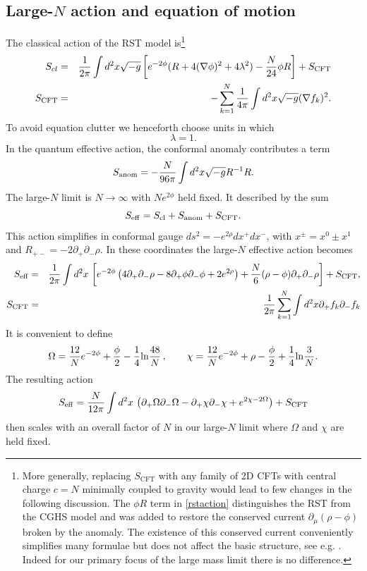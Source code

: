 \documentclass[12pt,oneside,letterpaper]{article}
\newcommand{\p}{\partial}
\newcommand{\f}{\frac}
\newcommand{\be}{\begin{equation}}
\newcommand{\ee}{\end{equation}}
\def\be{\begin{eqnarray}}
\def\ee{\end{eqnarray}}
\newcommand{\bea}{\begin{eqnarray}}
\newcommand{\eea}{\end{eqnarray}}
\let\l=\lambda \let\m=\mu \let\n=\nu \let\x=\xi \let\p=\phi \let\r=v
\let\f=\frac
\def\be{\begin{equation}}
\def\ee{\end{equation}}
\def\del{\partial}
\def\m{{M}}
\def\log{{\rm ln}}
\renewcommand{\p}{\partial}
\numberwithin{equation}{section}
\def \be {\begin{equation}}
\def \ee {\end{equation}}
\begin{document}
\subsection{Large-$N$ action and equation of motion}
The classical action of the RST model  is\footnote{More generally, replacing $S_{\text{CFT}}$ with any family of 2D CFTs with central charge $c=N$ minimally coupled to gravity would lead to few changes in the following discussion. The $\phi R$ term in \eqref{rstaction} distinguishes the RST from the CGHS model \cite{Callan:1992rs} and was added to restore the conserved current $\partial_\mu (\rho-\phi)$ broken by the anomaly. The existence of this conserved current conveniently simplifies many formulae but does not affect the basic structure, see e.g. \cite{Piran:1993tq}. Indeed for our primary focus of the large mass limit there is no difference. }
\bea\label{rstaction}
S_{cl} &=& \f{1}{2\pi}\int d^2 x \sqrt{-g} \left[e^{-2\phi}(R+4(\nabla \phi)^2+4\l^2) 
-\f{N}{24}  \phi R\right]+S_{\text{CFT}}\cr S_{\text{CFT}}&=& -\sum_{k=1}^N\f{1}{4\pi}\int d^2 x \sqrt{-g}(\nabla f_k)^2   .
\eea
To avoid equation clutter we henceforth choose units  in which 
\be \l=1.\ee
In the quantum effective action, the conformal anomaly contributes a term  \be S_{\rm anom} = -\frac{N}{96\pi} \int d^2 x \sqrt{-g}R \Box^{-1}R.\ee   The large-$N$ limit is  $N\to \infty$ with $Ne^{2\phi}$ held fixed. It described  by the sum \be S_{\rm eff}=S_{\rm cl}+S_{\rm anom}+S_{\text{CFT}}.\ee
This action simplifies in conformal gauge $ds^2 = -e^{2\rho}dx^+ dx^-$, with $x^{\pm} = x^0\pm x^1$ and $R_{+-}=-2\del_+\del_-\rho$. In these coordinates the large-$N$ effective action  becomes
\bea\label{rsteff}
S_{\rm eff}&=&\f{1}{2\pi}\int d^2 x\, \left[e^{-2\phi}\left(4\p_+\p_- \rho-8 \p_+\phi \p_-\phi+2e^{2\rho}\right) +\f{N}{6}(\rho-\phi) \partial_+\partial_-\rho \right] +S_{\text{CFT}}, \cr
S_{\text{CFT}}&=& \f{1}{2\pi}\sum_{k=1}^N\int d^2 x \del_+ f_k\del_- f_k  
\eea
It is convenient to define 
\be\label{omegachi}
\Omega = {12 \over N}e^{-2\phi}+\f{\phi}{2}-\f 1 4 \log {48 \over N}\,,\qquad \chi = {12 \over N}e^{-2\phi}+\rho-\f{\phi}{2}+\f 1 4 \log {3 \over N}.
\ee
The resulting action 
\be\label{bilca}
S_{\rm eff}=\f{N}{12\pi}\int d^2 x \,\left(\partial_+ \Omega\partial_- \Omega -\partial_+\chi \partial_-\chi + e^{2\chi-2\Omega}\right)+S_{\text{CFT}}
\ee
then scales with an overall factor of $N$ in our large-$N$ limit where $\Omega$ and $\chi$ are held fixed. 
\end{document}
